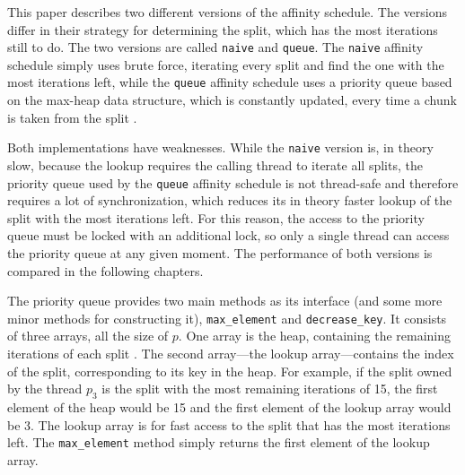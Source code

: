 \documentclass[twoside,11pt]{article}
\begin{document}
This paper describes two different versions of the affinity
schedule.
The versions differ in their strategy for determining the
split, which has the most iterations still to do.
The two versions are called \texttt{naive} and
\texttt{queue}.
The \texttt{naive} affinity schedule simply uses brute
force, iterating every split and find the one with the most
iterations left, while the \texttt{queue} affinity schedule
uses a priority queue based on the max-heap data structure,
which is constantly updated, every time a chunk is taken
from the split \citep[for the max-heap data structure see
e.g.][Chapter 6]{cormen}.

Both implementations have weaknesses.
While the \texttt{naive} version is, in theory slow,
because the lookup requires the calling thread to iterate
all splits, the priority queue used by the \texttt{queue}
affinity schedule is not thread-safe and therefore requires
a lot of synchronization, which reduces its in theory
faster lookup of the split with the most iterations left.
For this reason, the access to the priority queue must be
locked with an additional lock, so only
a single thread can access the priority queue at any given
moment.
The performance of both versions is compared in the
following chapters.

The priority queue provides two main methods as its
interface (and some more minor methods for constructing
it), \texttt{max\_element} and \texttt{decrease\_key}.
It consists of three arrays, all the size of $p$.
One array is the heap, containing the remaining iterations
of each split \citep[see][Chapter 6]{cormen}.
The second array---the lookup array---contains the index of
the split, corresponding to its key in the heap.
For example, if the split owned by the thread $p_3$ is the
split with the most remaining iterations of 15, the first
element of the heap would be 15 and the first element of
the lookup array would be 3.
The lookup array is for fast access to the split that has
the most iterations left.
The \texttt{max\_element} method simply returns the first
element of the lookup array.
\end{document}
